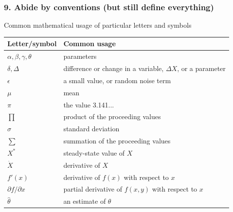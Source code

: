 
\begin{frame}
\frametitle{9. Abide by conventions (but still define everything)}

\centering Common mathematical usage of particular letters and symbols
\begin{table}
  \centering{}
  \begin{tabular}{ll}
\hline
Letter/symbol & Common usage\\
\hline
$\alpha, \beta, \gamma, \theta$ & parameters\\
$\delta, \Delta$ & difference or change in a variable, $\Delta X$, or a
  parameter\\
$\epsilon$ & a small value, or random noise term\\
$\mu$ & mean\\
$\pi$ & the value 3.141...\\
$\prod$ & product of the proceeding values\\
$\sigma$ & standard deviation\\
$\sum$ & summation of the proceeding values\\
$X^*$ & steady-state value of $X$\\
$\dot{X}$ & derivative of $X$\\  %
$f'(x)$ & derivative of $f(x)$ with respect to $x$\\
$\partial f/\partial x$ & partial derivative of $f(x,y)$ with respect to $x$\\
$\hat{\theta}$ & an estimate of $\theta$\\
\hline
\end{tabular}
\end{table}

\end{frame}


\begin{frame}
\frametitle{}

\end{frame}


\begin{frame}
\frametitle{}

\end{frame}

